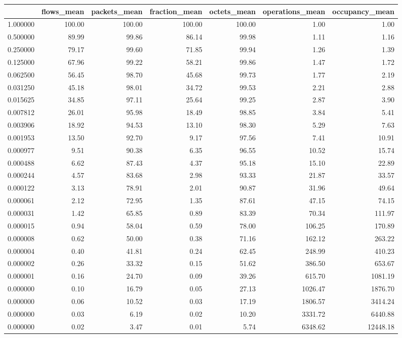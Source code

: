 \begin{tabular}{lrrrrrr}
\toprule
 & flows_mean & packets_mean & fraction_mean & octets_mean & operations_mean & occupancy_mean \\
\midrule
1.000000 & 100.00 & 100.00 & 100.00 & 100.00 & 1.00 & 1.00 \\
0.500000 & 89.99 & 99.86 & 86.14 & 99.98 & 1.11 & 1.16 \\
0.250000 & 79.17 & 99.60 & 71.85 & 99.94 & 1.26 & 1.39 \\
0.125000 & 67.96 & 99.22 & 58.21 & 99.86 & 1.47 & 1.72 \\
0.062500 & 56.45 & 98.70 & 45.68 & 99.73 & 1.77 & 2.19 \\
0.031250 & 45.18 & 98.01 & 34.72 & 99.53 & 2.21 & 2.88 \\
0.015625 & 34.85 & 97.11 & 25.64 & 99.25 & 2.87 & 3.90 \\
0.007812 & 26.01 & 95.98 & 18.49 & 98.85 & 3.84 & 5.41 \\
0.003906 & 18.92 & 94.53 & 13.10 & 98.30 & 5.29 & 7.63 \\
0.001953 & 13.50 & 92.70 & 9.17 & 97.56 & 7.41 & 10.91 \\
0.000977 & 9.51 & 90.38 & 6.35 & 96.55 & 10.52 & 15.74 \\
0.000488 & 6.62 & 87.43 & 4.37 & 95.18 & 15.10 & 22.89 \\
0.000244 & 4.57 & 83.68 & 2.98 & 93.33 & 21.87 & 33.57 \\
0.000122 & 3.13 & 78.91 & 2.01 & 90.87 & 31.96 & 49.64 \\
0.000061 & 2.12 & 72.95 & 1.35 & 87.61 & 47.15 & 74.15 \\
0.000031 & 1.42 & 65.85 & 0.89 & 83.39 & 70.34 & 111.97 \\
0.000015 & 0.94 & 58.04 & 0.59 & 78.00 & 106.25 & 170.89 \\
0.000008 & 0.62 & 50.00 & 0.38 & 71.16 & 162.12 & 263.22 \\
0.000004 & 0.40 & 41.81 & 0.24 & 62.45 & 248.99 & 410.23 \\
0.000002 & 0.26 & 33.32 & 0.15 & 51.62 & 386.50 & 653.67 \\
0.000001 & 0.16 & 24.70 & 0.09 & 39.26 & 615.70 & 1081.19 \\
0.000000 & 0.10 & 16.79 & 0.05 & 27.13 & 1026.47 & 1876.70 \\
0.000000 & 0.06 & 10.52 & 0.03 & 17.19 & 1806.57 & 3414.24 \\
0.000000 & 0.03 & 6.19 & 0.02 & 10.20 & 3331.72 & 6440.88 \\
0.000000 & 0.02 & 3.47 & 0.01 & 5.74 & 6348.62 & 12448.18 \\
\bottomrule
\end{tabular}
